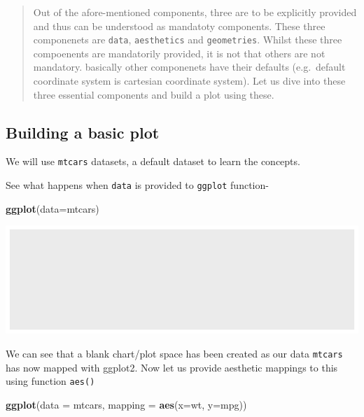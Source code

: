 \documentclass[
]{book}
\newenvironment{Shaded}{\begin{snugshade}}{\end{snugshade}}
\newcommand{\AttributeTok}[1]{\textcolor[rgb]{0.13,0.29,0.53}{#1}}
\newcommand{\FunctionTok}[1]{\textcolor[rgb]{0.13,0.29,0.53}{\textbf{#1}}}
\newcommand{\NormalTok}[1]{#1}
\begin{document}
\begin{quote}
Out of the afore-mentioned components, three are to be explicitly provided and thus can be understood as mandatoty components. These three componenets are \texttt{data}, \texttt{aesthetics} and \texttt{geometries}. Whilst these three compoenents are mandatorily provided, it is not that others are not mandatory. basically other componenets have their defaults (e.g.~default coordinate system is cartesian coordinate system). Let us dive into these three essential components and build a plot using these.
\end{quote}

\hypertarget{building-a-basic-plot}{%
\subsection{Building a basic plot}\label{building-a-basic-plot}}

We will use \texttt{mtcars} datasets, a default dataset to learn the concepts.

See what happens when \texttt{data} is provided to \texttt{ggplot} function-

\begin{Shaded}
\begin{Highlighting}[]
\FunctionTok{ggplot}\NormalTok{(}\AttributeTok{data=}\NormalTok{mtcars)}
\end{Highlighting}
\end{Shaded}

\begin{center}\includegraphics{DauR_files/figure-latex/fig_blank-1} \end{center}

We can see that a blank chart/plot space has been created as our data \texttt{mtcars} has now mapped with ggplot2. Now let us provide aesthetic mappings to this using function \texttt{aes()}

\begin{Shaded}
\begin{Highlighting}[]
\FunctionTok{ggplot}\NormalTok{(}\AttributeTok{data =}\NormalTok{ mtcars, }\AttributeTok{mapping =} \FunctionTok{aes}\NormalTok{(}\AttributeTok{x=}\NormalTok{wt, }\AttributeTok{y=}\NormalTok{mpg))}
\end{Highlighting}
\end{Shaded}
\end{document}

